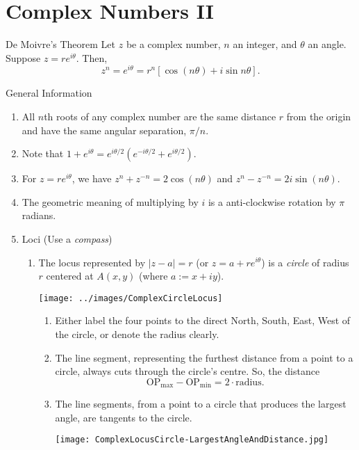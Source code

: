 \documentclass[oneside]{book}
\begin{document}
\section{Complex Numbers II}
\begin{theorem}{De Moivre's Theorem}{}
  Let \(z\) be a complex number, \(n\) an integer, and \(\theta\) an angle. Suppose \(z=re^{i\theta}\). Then, 
  \[z^n=e^{i\theta}=r^n[\cos(n\theta)+i\sin{n\theta}].\]
\end{theorem}
\begin{stbox}{General Information}
  \begin{enumerate}
    \item All \(n\)th roots of any complex number are the same distance \(r\) from the origin and have the same angular separation, \(\pi/n\).
    \item Note that \(1+e^{i\theta}=e^{i\theta/2}(e^{-i\theta/2}+e^{i\theta/2})\).
    \item For \(z=re^{i\theta}\), we have \(z^n+z^{-n}=2\cos(n\theta)\) and \(z^n-z^{-n}=2i\sin(n\theta)\).
    \item The geometric meaning of multiplying by \(i\) is a anti-clockwise rotation by \(\pi\) radians.
    \item Loci (Use a \emph{compass})
    \begin{enumerate}
      \item The locus represented by \(\lvert z-a \rvert =r\) (or \(z=a+re^{i\theta}\)) is a \emph{circle} of radius \(r\) centered at \(A(x,y)\) (where \(a:=x+iy\)).
      \begin{center}
        \texttt{[image: ../images/ComplexCircleLocus]}
      \end{center}
      \begin{enumerate}
        \item Either label the four points to the direct North, South, East, West of the circle, or denote the radius clearly. 
        \item The line segment, representing the furthest distance from a point to a circle, always cuts through the circle's centre. So, the distance
        \[\text{OP}_{\text{max}}-\text{OP}_{\text{min}}=2\cdot\text{radius}.\]
        \item The line segments, from a point to a circle that produces the largest angle, are tangents to the circle.
        \begin{center}
          \texttt{[image: ComplexLocusCircle-LargestAngleAndDistance.jpg]}

\end{center}
\end{enumerate}
\end{enumerate}
\end{enumerate}
\end{stbox}
\end{document}

